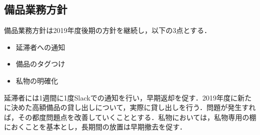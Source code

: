 \subsection*{備品業務方針}
備品業務方針は2019年度後期の方針を継続し，以下の3点とする．
\begin{itemize}
    \item 延滞者への通知
    \item 備品のタグつけ
    \item 私物の明確化
\end{itemize}
延滞者には1週間に1度Slackでの通知を行い，早期返却を促す．2019年度に新たに決めた高額備品の貸し出しについて，実際に貸し出しを行う．問題が発生すれば，その都度問題点を改善していくこととする．私物においては，私物専用の棚におくことを基本とし，長期間の放置は早期撤去を促す．

